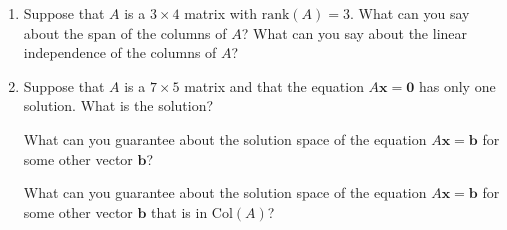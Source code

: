 \documentclass[12pt]{article}
\newcommand{\vs}[1]{\vspace{#1in}}
\newcommand{\bvec}{{\mathbf b}}
\newcommand{\xvec}{{\mathbf x}}
\newcommand{\zerovec}{{\mathbf 0}}
\newcommand{\rank}{\text{rank}}
\newcommand{\col}{\text{Col}}
\begin{document}
\begin{enumerate}
  \vs{1}

\item Suppose that $A$ is a $3\times4$ matrix with $\rank(A) = 3$.
  What can you say about the span of the columns of $A$?  What can you
  say about the linear independence of the columns of $A$?

  \vs{1.5}
\item Suppose that $A$ is a $7\times 5$ matrix and that the equation
  $A\xvec=\zerovec$ has only one solution.  What is the solution?

  \vs{1}
  What can you guarantee about the solution space of the equation
  $A\xvec=\bvec$ for some other vector $\bvec$?

  \vs{1}
  What can you guarantee about the solution space of the equation
  $A\xvec=\bvec$ for some other vector $\bvec$ that is in $\col(A)$? 
  
  



\end{enumerate}
\end{document}
